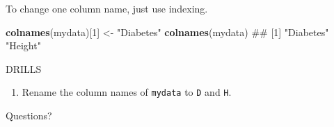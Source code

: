 \documentclass[ignorenonframetext,]{beamer}
\newenvironment{Shaded}{\begin{snugshade}}{\end{snugshade}}
\newcommand{\KeywordTok}[1]{\textcolor[rgb]{0.13,0.29,0.53}{\textbf{#1}}}
\newcommand{\DecValTok}[1]{\textcolor[rgb]{0.00,0.00,0.81}{#1}}
\newcommand{\StringTok}[1]{\textcolor[rgb]{0.31,0.60,0.02}{#1}}
\newcommand{\NormalTok}[1]{#1}
\providecommand{\tightlist}{%
  \setlength{\itemsep}{0pt}\setlength{\parskip}{0pt}}
\begin{document}
\begin{frame}[fragile]

To change one column name, just use indexing.

\begin{Shaded}
\begin{Highlighting}[]
\KeywordTok{colnames}\NormalTok{(mydata)[}\DecValTok{1}\NormalTok{] <-}\StringTok{ "Diabetes"}
\KeywordTok{colnames}\NormalTok{(mydata)}
\NormalTok{## [1] "Diabetes" "Height"}
\end{Highlighting}
\end{Shaded}

\end{frame}

\begin{frame}[fragile]{DRILLS}

\begin{enumerate}[<+->]
\def\labelenumi{\arabic{enumi}.}
\tightlist
\item
  Rename the column names of \texttt{mydata} to \texttt{D} and
  \texttt{H}.
\end{enumerate}

\end{frame}

\begin{frame}{Questions?}

\end{frame}
\end{document}
